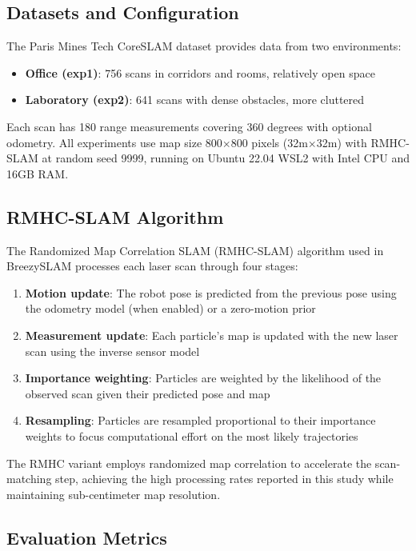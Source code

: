 \documentclass[conference]{IEEEtran}
\begin{document}
  \subsection{Datasets and Configuration}

  The Paris Mines Tech CoreSLAM dataset provides data from two environments:
  \begin{itemize}
      \item \textbf{Office (exp1)}: 756 scans in corridors and rooms, relatively open space
      \item \textbf{Laboratory (exp2)}: 641 scans with dense obstacles, more cluttered
  \end{itemize}

  Each scan has 180 range measurements covering 360 degrees with optional odometry. All experiments use
  map size 800$\times$800 pixels (32m$\times$32m) with RMHC-SLAM at random seed 9999, running on Ubuntu
  22.04 WSL2 with Intel CPU and 16GB RAM.

  \subsection{RMHC-SLAM Algorithm}

  The Randomized Map Correlation SLAM (RMHC-SLAM) algorithm used in BreezySLAM processes each laser scan
  through four stages:

  \begin{enumerate}
      \item \textbf{Motion update}: The robot pose is predicted from the previous pose using the odometry
  model (when enabled) or a zero-motion prior
      \item \textbf{Measurement update}: Each particle's map is updated with the new laser scan using the
  inverse sensor model
      \item \textbf{Importance weighting}: Particles are weighted by the likelihood of the observed scan
  given their predicted pose and map
      \item \textbf{Resampling}: Particles are resampled proportional to their importance weights to focus
  computational effort on the most likely trajectories
  \end{enumerate}

  The RMHC variant employs randomized map correlation to accelerate the scan-matching step, achieving the
  high processing rates reported in this study while maintaining sub-centimeter map resolution.

  \subsection{Evaluation Metrics}
\end{document}
